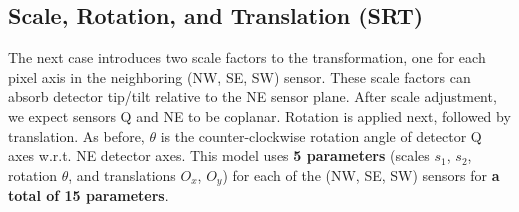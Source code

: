\documentclass{article}
\begin{document}
\subsection{Scale, Rotation, and Translation (SRT)}

The next case introduces two scale factors to the transformation, one for each
pixel axis in the neighboring (NW, SE, SW) sensor. These scale factors can
absorb detector tip/tilt relative to the NE sensor plane. After scale
adjustment, we expect sensors Q and NE to be coplanar.
Rotation is applied next, followed by translation. As before, $\theta$ is the
counter-clockwise rotation angle of detector Q axes w.r.t. NE detector axes. 
This model uses \textbf{5 parameters} (scales $s_1$, $s_2$, 
rotation $\theta$, and translations $O_x$, $O_y$) for each of the (NW, SE, SW)
sensors for \textbf{a total of 15 parameters}. 
\end{document}
